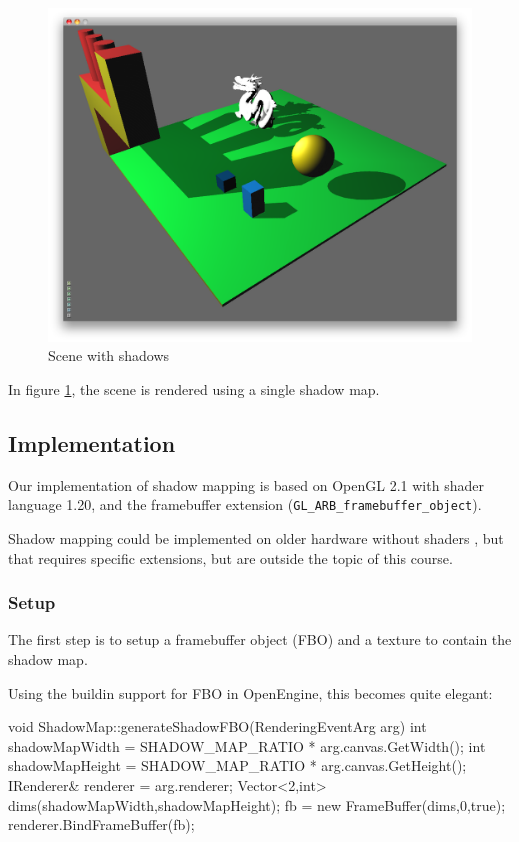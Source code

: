 \begin{figure}[h]
  \centering
  \includegraphics[width=\textwidth]{gfx/scenewithshadow}  
  \caption{Scene with shadows}
  \label{fig:sceneshadow}
\end{figure}

In figure \ref{fig:sceneshadow}, the scene is rendered using a single
shadow map.

\newpage


\subsection{Implementation}

Our implementation of shadow mapping is based on OpenGL 2.1 with
shader language 1.20, and the framebuffer extension
(\texttt{GL\_ARB\_framebuffer\_object}).

Shadow mapping could be implemented on older hardware without
shaders \citep{nv01}, but that requires specific extensions, but are
outside the topic of this course.


\subsubsection*{Setup}

The first step is to setup a framebuffer object (FBO) and a texture to
contain the shadow map.

Using the buildin support for FBO in OpenEngine, this becomes quite elegant:

\begin{cppcode}
void ShadowMap::generateShadowFBO(RenderingEventArg arg) {
	int shadowMapWidth = SHADOW_MAP_RATIO * arg.canvas.GetWidth();
	int shadowMapHeight = SHADOW_MAP_RATIO * arg.canvas.GetHeight();
    IRenderer& renderer = arg.renderer;
    Vector<2,int> dims(shadowMapWidth,shadowMapHeight);
    fb = new FrameBuffer(dims,0,true);
    renderer.BindFrameBuffer(fb);
}
\end{cppcode}

